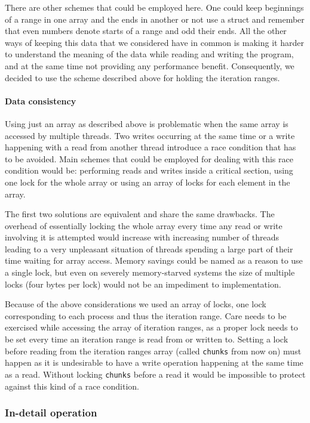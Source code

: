 \documentclass[11pt,a4paper]{article}
\begin{document}
There are other schemes that could be employed here. 
One could keep beginnings of a range in one array and the ends in another or not use a struct and remember that even numbers denote starts of a range and odd their ends. 
All the other ways of keeping this data that we considered have in common is making it harder to understand the meaning of the data while reading and writing the program, and at the same time not providing any performance benefit.
Consequently, we decided to use the scheme described above for holding the iteration ranges.

\paragraph{Data consistency}
Using just an array as described above is problematic when the same array is accessed by multiple threads.
Two writes occurring at the same time or a write happening with a read from another thread introduce a race condition that has to be avoided.
Main schemes that could be employed for dealing with this race condition would be: performing reads and writes inside a critical section, using one lock for the whole array or using an array of locks for each element in the array.

The first two solutions are equivalent and share the same drawbacks. 
The overhead of essentially locking the whole array every time any read or write involving it is attempted would increase with increasing number of threads leading to a very unpleasant situation of threads spending a large part of their time waiting for array access.
Memory savings could be named as a reason to use a single lock, but even on severely memory-starved systems the size of multiple locks (four bytes per lock) would not be an impediment to implementation.

Because of the above considerations we used an array of locks, one lock corresponding to each process and thus the iteration range.
Care needs to be exercised while accessing the array of iteration ranges, as a proper lock needs to be set every time an iteration range is read from or written to.
Setting a lock before reading from the iteration ranges array (called \texttt{chunks} from now on) must happen as it is undesirable to have a write operation happening at the same time as a read.
Without locking \texttt{chunks} before a read it would be impossible to protect against this kind of a race condition.

\subsubsection{In-detail operation}
\end{document}
